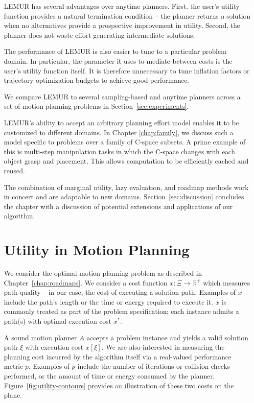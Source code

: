 LEMUR has several advantages over anytime planners.
First,
the user's utility function provides a natural termination condition
-- the planner returns a solution when no alternatives provide
a prospective improvement in utility.
Second, the planner does not waste effort generating
intermediate solutions.

The performance of LEMUR is also easier to tune to a particular
problem domain.
In particular,
the parameter it uses to mediate between costs is
the user's utility function itself.
It is therefore unnecessary to tune inflation factors or
trajectory optimization budgets to achieve good performance.

We compare LEMUR to several sampling-based and anytime planners
across a set of motion planning problems
in Section~\ref{sec:experiments}.

LEMUR's ability to accept an arbitrary planning effort model
enables it to be customized to different domains.
In Chapter \ref{chap:family},
we discuss such a model specific to problems over a family of
C-space subsets.
A prime example of this is multi-step manipulation tasks
in which the C-space changes with each object grasp and placement.
This allows computation to be efficiently cached and reused.

The combination of
marginal utility, lazy evaluation, and roadmap methods
work in concert and are adaptable to new domains.
Section~\ref{sec:discussion} concludes the chapter with a discussion
of potential extensions and applications of our algorithm.

\section{Utility in Motion Planning}
\label{sec:utility}

We consider the optimal motion planning problem
as described in Chapter~\ref{chap:roadmaps}.
We consider a cost function
$x: \Xi \rightarrow \mathbb{R}^+$
which measures path quality --
in our case, the cost of executing a solution path.
Examples of $x$ include the path's length
or the time or energy required to execute it.
$x$ is commonly treated as part of the problem specification;
each instance admits a path(s) with optimal execution cost $x^*$.

A sound motion planner $A$ accepts a problem instance
and yields a valid solution path $\xi$
with execution cost $x[\xi]$.
We are also interested in measuring the planning cost incurred by
the algorithm itself
via a real-valued performance metric $p$.
Examples of $p$ include the number of iterations or
collision checks performed,
or the amount of time or energy consumed by the planner.
Figure~\ref{fig:utility-contours} provides an illustration of
these two costs on the plane.

